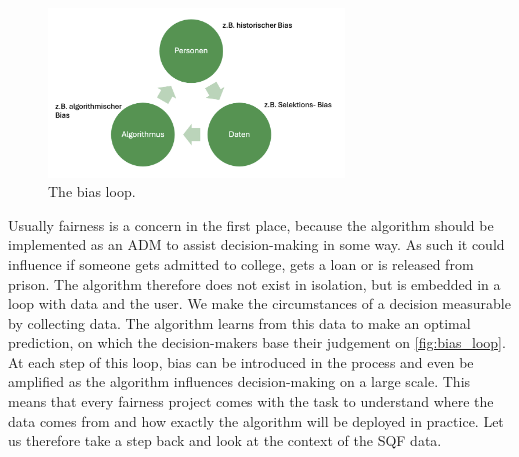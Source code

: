 


\begin{figure}
    \centering
    \includegraphics[width=0.7\textwidth]{../figures/bias_loop.png}
    \caption{The bias loop.}
    \label{fig:bias_loop}
\end{figure}

Usually fairness is a concern in the first place, because the algorithm should be implemented as an ADM to assist decision-making in some way. As such it could influence if someone gets admitted to college, gets a loan or is released from prison. The algorithm therefore does not exist in isolation, but is embedded in a loop with data and the user.
We make the circumstances of a decision measurable by collecting data. The algorithm learns from this data to make an optimal prediction, on which the decision-makers base their judgement on \autoref{fig:bias_loop}. At each step of this loop, bias can be introduced in the process and even be amplified as the algorithm influences decision-making on a large scale.
This means that every fairness project comes with the task to understand where the data comes from and how exactly the algorithm will be deployed in practice. Let us therefore take a step back and look at the context of the SQF data.

